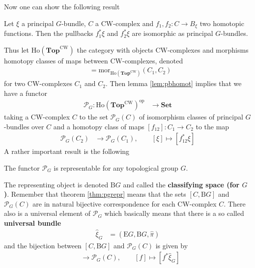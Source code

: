 Now one can show the following result
\\
\begin{lem}
\label{lem:pbhomot}
Let $\xi$ a principal $G$-bundle, $C$ a CW-complex and $f_{1},f_{2} \colon C \to B_{\xi}$ two homotopic functions. Then the pullbacks $f_{1}^{\ast}\xi$ and $f_{2}^{\ast}\xi$ are isomorphic as principal $G$-bundles.
\end{lem}
Thus let $\mathrm{Ho}(\mathbf{Top}^{\mathrm{CW}})$ the category with objects CW-complexes and morphisms homotopy classes of maps between CW-complexes, denoted
\begin{align*}
  [C_{1},C_{2}]
  &=
  \mathrm{mor}_{\mathrm{Ho}(\mathbf{Top}^{\mathrm{CW}})}
  \left(
    C_{1}
    ,
    C_{2}
  \right)
\end{align*}
for two CW-complexes $C_{1}$ and $C_{2}$. Then lemma \ref{lem:pbhomot} implies that we have a functor
\begin{align*}
  \mathcal{P}_{G}
  \colon
  \mathrm{Ho}(\mathbf{Top}^{\mathrm{CW}})^{\mathrm{op}}
  &\to
  \mathbf{Set}
\end{align*}
taking a CW-complex $C$ to the set $\mathcal{P}_{G}(C)$ of isomorphism classes of principal $G$-bundles over $C$ and a homotopy class of maps $[f_{12}] \colon C_{1} \to C_{2}$ to the map
\begin{align*}
  \mathcal{P}_{G}(C_{2})
  &\to
  \mathcal{P}_{G}(C_{1})
  ,\qquad
  [\xi]
  \mapsto
  [f_{12}^{\ast}\xi]
\end{align*}
A rather important result is the following
\\
\begin{thm}
\label{thm:pgrepr}
The functor $\mathcal{P}_{G}$ is representable for any topological group $G$.
\end{thm}
The representing object is denoted $\textrm{B}G$ and called the \textbf{classifying space (for $G$)}. Remember that theorem \ref{thm:pgrepr} means that the sets $[C,\textrm{B}G]$ and $\mathcal{P}_{G}(C)$ are in natural bijective correspondence for each CW-complex $C$. There also is a universal element of $\mathcal{P}_{G}$ which basically means that there is a so called \textbf{universal bundle}
\begin{align*}
  \hat{\xi}_{G}
  &=
  \left(
    \textrm{E}G
    ,
    \textrm{B}G
    ,
    \hat{\pi}
  \right)
\end{align*}
and the bijection between $[C,\textrm{B}G]$ and $\mathcal{P}_{G}(C)$ is given by
\begin{align*}
  [C,\textrm{B}G]
  &\to
  \mathcal{P}_{G}(C)
  ,\qquad
  [f]
  \mapsto
  [f^{\ast}\hat{\xi}_{G}]
\end{align*}
